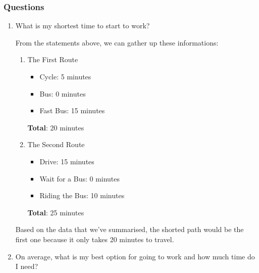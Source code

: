 \documentclass[12pt,titlepage]{article}
\begin{document}
\subsubsection*{Questions}
\begin{enumerate}
    \item {
        What is my shortest time to start to work?

        From the statements above, we can gather up these informations:
        \begin{enumerate}
            \item {
                The First Route
                \begin{itemize}
                    \item Cycle: 5 minutes
                    \item Bus: 0 minutes
                    \item Fast Bus: 15 minutes
                \end{itemize}
                \textbf{Total}: 20 minutes
                }
                \item {
                    The Second Route
                    \begin{itemize}
                        \item Drive: 15 minutes
                        \item Wait for a Bus: 0 minutes
                        \item Riding the Bus: 10 minutes
                    \end{itemize}
                \textbf{Total}: 25 minutes
            }
        \end{enumerate}
        Based on the data that we've summarised, the shorted path would be the first one because it only takes 20 minutes to travel.
    }
    \pagebreak
    \item {
        On average, what is my best option for going to work and how much time do I need?

}
\end{enumerate}
\end{document}
